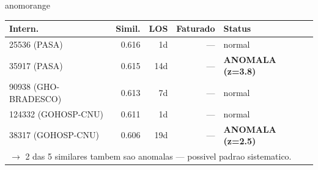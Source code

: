 \documentclass[a4paper,10pt]{article}
\begin{document}
\begin{anomalycard}[Internacao 163465 | GHO-PETROBRAS | ALTO (z=4.28)]{anomorange}
\begin{tabular}{l r r r l}\toprule\textbf{Intern.} & \textbf{Simil.} & \textbf{LOS} & \textbf{Faturado} & \textbf{Status} \\\midrule
25536 (PASA) & 0.616 & 1d & --- & \textcolor{jcubeblue}{normal} \\
35917 (PASA) & 0.615 & 14d & --- & \textcolor{anomred}{\textbf{ANOMALA (z=3.8)}} \\
90938 (GHO-BRADESCO) & 0.613 & 7d & --- & \textcolor{jcubeblue}{normal} \\
124332 (GOHOSP-CNU) & 0.611 & 1d & --- & \textcolor{jcubeblue}{normal} \\
38317 (GOHOSP-CNU) & 0.606 & 19d & --- & \textcolor{anomred}{\textbf{ANOMALA (z=2.5)}} \\
\multicolumn{5}{l}{\textcolor{anomred}{\small $\rightarrow$ 2 das 5 similares tambem sao anomalas --- possivel padrao sistematico.}} \\
\bottomrule\end{tabular}


\end{anomalycard}

\newpage
\end{document}
